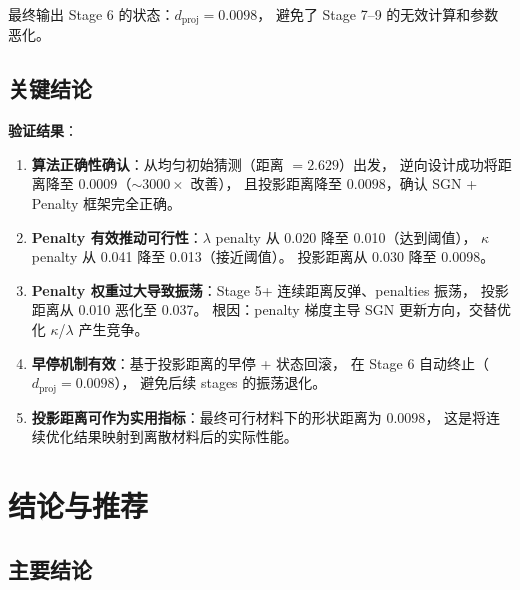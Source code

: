 \documentclass[12pt,a4paper]{article}
\begin{document}
最终输出 Stage 6 的状态：$d_\text{proj} = \mathbf{0.0098}$，
避免了 Stage 7--9 的无效计算和参数恶化。

\subsection{关键结论}

\begin{framed}
\noindent \textbf{验证结果}：
\begin{enumerate}
    \item \textbf{算法正确性确认}：从均匀初始猜测（距离 $= 2.629$）出发，
    逆向设计成功将距离降至 $0.0009$（$\sim 3000\times$ 改善），
    且投影距离降至 $0.0098$，确认 SGN + Penalty 框架完全正确。

    \item \textbf{Penalty 有效推动可行性}：$\lambda$ penalty 从 0.020 降至 0.010（达到阈值），
    $\kappa$ penalty 从 0.041 降至 0.013（接近阈值）。
    投影距离从 0.030 降至 0.0098。

    \item \textbf{Penalty 权重过大导致振荡}：Stage 5+ 连续距离反弹、penalties 振荡，
    投影距离从 0.010 恶化至 0.037。
    根因：penalty 梯度主导 SGN 更新方向，交替优化 $\kappa$/$\lambda$ 产生竞争。

    \item \textbf{早停机制有效}：基于投影距离的早停 + 状态回滚，
    在 Stage 6 自动终止（$d_\text{proj} = 0.0098$），
    避免后续 stages 的振荡退化。

    \item \textbf{投影距离可作为实用指标}：最终可行材料下的形状距离为 $0.0098$，
    这是将连续优化结果映射到离散材料后的实际性能。
\end{enumerate}
\end{framed}

\section{结论与推荐}

\subsection{主要结论}
\end{document}
